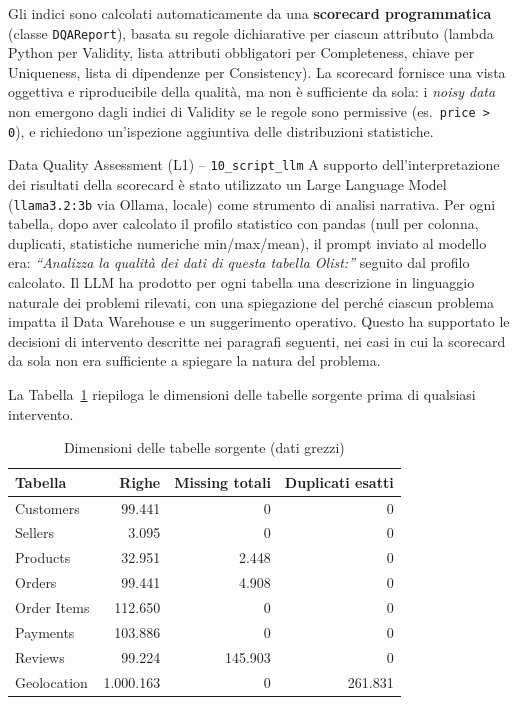 \documentclass[12pt,a4paper]{article}
\begin{document}
Gli indici sono calcolati automaticamente da una \textbf{scorecard programmatica}
(classe \texttt{DQAReport}), basata su regole dichiarative per ciascun attributo
(lambda Python per Validity, lista attributi obbligatori per Completeness, chiave per
Uniqueness, lista di dipendenze per Consistency). La scorecard fornisce una vista
oggettiva e riproducibile della qualità, ma non è sufficiente da sola: i
\textit{noisy data} non emergono dagli indici di Validity se le regole sono permissive
(es.\ \texttt{price > 0}), e richiedono un'ispezione aggiuntiva delle distribuzioni
statistiche.

\begin{aibox}{Data Quality Assessment (L1) -- \texttt{10\_script\_llm}}
A supporto dell'interpretazione dei risultati della scorecard è stato utilizzato
un Large Language Model (\texttt{llama3.2:3b} via Ollama, locale) come strumento
di analisi narrativa. Per ogni tabella, dopo aver calcolato il profilo statistico
con pandas (null per colonna, duplicati, statistiche numeriche min/max/mean), il
prompt inviato al modello era: \textit{``Analizza la qualità dei dati di questa
tabella Olist:''} seguito dal profilo calcolato.
Il LLM ha prodotto per ogni tabella una descrizione in linguaggio naturale dei
problemi rilevati, con una spiegazione del perché ciascun problema impatta il
Data Warehouse e un suggerimento operativo. Questo ha supportato le decisioni
di intervento descritte nei paragrafi seguenti, nei casi in cui la scorecard da
sola non era sufficiente a spiegare la natura del problema.
\end{aibox}

La Tabella~\ref{tab:raw} riepiloga le dimensioni delle tabelle sorgente prima di
qualsiasi intervento.

\begin{table}[H]
  \centering
  \caption{Dimensioni delle tabelle sorgente (dati grezzi)}
  \label{tab:raw}
  \begin{tabular}{lrrr}
    \toprule
    \textbf{Tabella} & \textbf{Righe} & \textbf{Missing totali} & \textbf{Duplicati esatti} \\
    \midrule
    Customers    &   99.441 &       0 &       0 \\
    Sellers      &    3.095 &       0 &       0 \\
    Products     &   32.951 &   2.448 &       0 \\
    Orders       &   99.441 &   4.908 &       0 \\
    Order Items  &  112.650 &       0 &       0 \\
    Payments     &  103.886 &       0 &       0 \\
    Reviews      &   99.224 & 145.903 &       0 \\
    Geolocation  & 1.000.163 &      0 & 261.831 \\
    \bottomrule
  \end{tabular}
\end{table}
\end{document}
